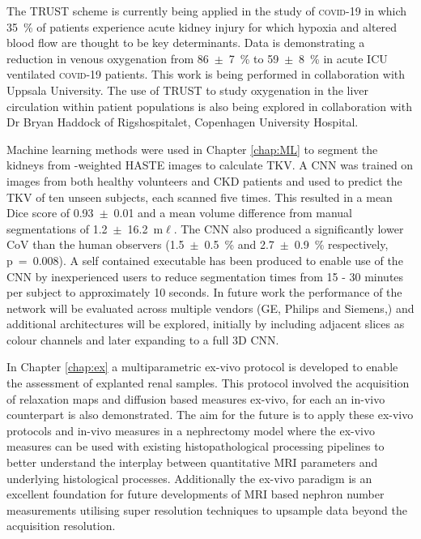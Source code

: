 The \ac{TRUST} scheme is currently being applied in the study of \textsc{covid}-19 in which 35~\% of patients experience acute kidney injury for which hypoxia and altered blood flow are thought to be key determinants. Data is demonstrating a reduction in venous oxygenation from 86~$\pm$~7~\% to 59~$\pm$~8~\% in acute \ac{ICU} ventilated \textsc{covid}-19 patients. This work is being performed in collaboration with Uppsala University. The use of \ac{TRUST} to study oxygenation in the liver circulation within patient populations is also being explored in collaboration with Dr Bryan Haddock of Rigshospitalet, Copenhagen University Hospital.

Machine learning methods were used in Chapter \ref{chap:ML} to segment the kidneys from \ttwo-weighted \ac{HASTE} images to calculate \ac{TKV}. A \ac{CNN} was trained on images from both healthy volunteers and \ac{CKD} patients and used to predict the \ac{TKV} of ten unseen subjects, each scanned five times. This resulted in a mean Dice score of 0.93~$\pm$~0.01 and a mean volume difference from manual segmentations of 1.2~$\pm$~16.2~m$\ell$. The \ac{CNN} also produced a significantly lower \ac{CoV} than the human observers (1.5~$\pm$~0.5~\% and 2.7~$\pm$~0.9~\% respectively, p~=~0.008). A self contained executable has been produced to enable use of the \ac{CNN} by inexperienced users to reduce segmentation times from 15 - 30 minutes per subject to approximately 10 seconds. In future work the performance of the network will be evaluated across multiple vendors (GE, Philips and Siemens,) and additional architectures will be explored, initially by including adjacent slices as colour channels and later expanding to a full 3D \ac{CNN}. 

In Chapter \ref{chap:ex} a multiparametric ex-vivo protocol is developed to enable the assessment of explanted renal samples. This protocol involved the acquisition of relaxation maps and diffusion based measures ex-vivo, for each an in-vivo counterpart is also demonstrated. The aim for the future is to apply these ex-vivo protocols and in-vivo measures in a nephrectomy model where the ex-vivo measures can be used with existing histopathological processing pipelines to better understand the interplay between quantitative \ac{MRI} parameters and underlying histological processes. Additionally the ex-vivo paradigm is an excellent foundation for future developments of \ac{MRI} based nephron number measurements utilising super resolution techniques to upsample data beyond the acquisition resolution.

